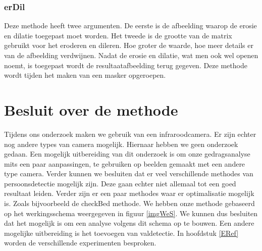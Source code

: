 \subsubsection{erDil}
Deze methode heeft twee argumenten. De eerste is de afbeelding waarop de erosie en dilatie toegepast moet worden. Het tweede is de grootte van de matrix gebruikt voor het eroderen en dileren. Hoe groter de waarde, hoe meer details er van de afbeelding verdwijnen. Nadat de erosie en dilatie, wat men ook wel openen noemt, is toegepast wordt de resultaatafbeelding terug gegeven. Deze methode wordt tijden het maken van een masker opgeroepen. 

\section{Besluit over de methode}
\label{MRefBes}
Tijdens ons onderzoek maken we gebruik van een infraroodcamera. Er zijn echter nog andere types van camera mogelijk. Hiernaar hebben we geen onderzoek gedaan. Een mogelijk uitbereiding van dit onderzoek is om onze gedragsanalyse mits een paar aanpassingen, te gebruiken op beelden gemaakt met een andere type camera.
Verder kunnen we besluiten dat er veel verschillende methodes van persoonsdetectie mogelijk zijn. Deze gaan echter niet allemaal tot een goed resultaat leiden. Verder zijn er een paar methodes waar er optimalisatie mogelijk is. Zoals bijvoorbeeld de checkBed methode. We hebben onze methode gebaseerd op het werkingsschema weergegeven in figuur \ref{imgWeS}. We kunnen dus besluiten dat het mogelijk is om een analyse volgens dit schema op te bouwen. Een andere mogelijke uitbereiding is het toevoegen van valdetectie. In hoofdstuk \ref{ERef} worden de verschillende experimenten besproken.